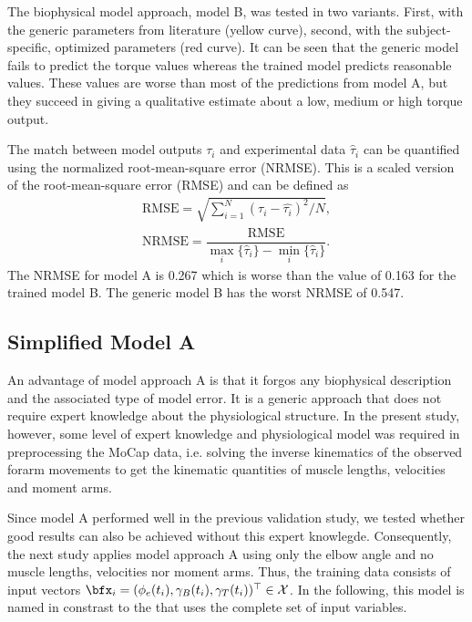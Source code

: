 The biophysical model approach, model B, was tested in two variants. First, with the generic parameters from literature (yellow curve), second, with the subject-specific, optimized parameters (red curve). It can be seen that the generic model fails to predict the torque values whereas the trained model predicts reasonable values. These values are worse than most of the predictions from model A, but they succeed in giving a qualitative estimate about a low, medium or high torque output.

The match between model outputs $\tau_i$ and experimental data $\hat\tau_i$ can be quantified using the normalized root-mean-square error (NRMSE). This is a scaled version of the root-mean-square error (RMSE) and can be defined as
\begin{equation*}
  \begin{array}{lll}
    \text{RMSE} = \sqrt{\sum\limits_{i=1}^N (\tau_i - \hat{\tau_i})^2 / N},\\[4mm]
    \text{NRMSE} = \dfrac{\text{RMSE}}{\max\limits_i\{\hat\tau_i\} - \min\limits_i\{\hat\tau_i\}}.
  \end{array}
\end{equation*}
The NRMSE for model A is 0.267 which is worse than the value of 0.163 for the trained model B. The generic model B has the worst NRMSE of 0.547.

\subsection{Simplified Model A}\label{sec:res_simplified_a}
An advantage of model approach A is that it forgos any biophysical description and the associated type of model error. It is a generic approach that does not require expert knowledge about the physiological structure. In the present study, however, some level of expert knowledge and physiological model was required in preprocessing the MoCap data, i.e. solving the inverse kinematics of the observed forarm movements to get the kinematic quantities of muscle lengths, velocities and moment arms. 

Since model A performed well in the previous validation study, we tested whether good results can also be achieved without this expert knowlegde.
Consequently, the next study applies model approach A using only the elbow angle and no muscle lengths, velocities nor moment arms. Thus, the training data consists of input vectors $\bfx_i = (\phi_e(t_i), \gamma_B(t_i), \gamma_T(t_i))^\top \in \mathcal{X}$. In the following, this model is named  in constrast to the  that uses the complete set of input variables.

